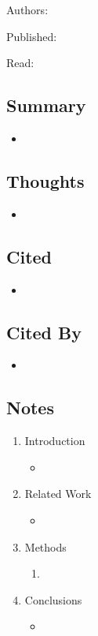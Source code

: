 \documentclass{article}
\begin{document}
\noindent Authors:

\noindent Published:

\noindent Read:

\subsection*{Summary}
\begin{itemize}
	\item 
\end{itemize}

\subsection*{Thoughts}
\begin{itemize}
	\item
\end{itemize}

\subsection*{Cited}
\begin{itemize}
	\item
\end{itemize}

\subsection*{Cited By}
\begin{itemize}
	\item
\end{itemize}

\subsection*{Notes}

\begin{enumerate}
	\item Introduction
	\begin{itemize}
		\item 
	\end{itemize}
	\item Related Work
	\begin{itemize}
		\item 
	\end{itemize}
	\item Methods
	\begin{enumerate}
		\item 
	\end{enumerate}
	\item Conclusions
	\begin{itemize}
		\item 
	\end{itemize}
\end{enumerate}
\end{document}
